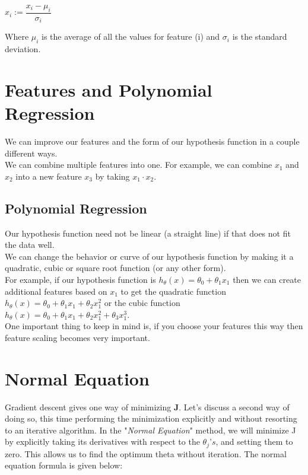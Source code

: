 \begin{center}
$x_i := \dfrac{x_i - \mu_i}{\sigma_i}$ 
\end{center}

Where $ \mu_i $ is the average of all the values for feature (i) and $ \sigma_i $ is the standard deviation.

\section{Features and Polynomial Regression}

We can improve our features and the form of our hypothesis function in a couple different ways.\\

We can combine multiple features into one. For example, we can combine $ x_1 $ and $ x_2  $ into a new feature $ x_3 $ by taking $ x_1 \cdot  x_2 $.\\

\subsection{Polynomial Regression}

Our hypothesis function need not be linear (a straight line) if that does not fit the data well.\\

We can change the behavior or curve of our hypothesis function by making it a quadratic, cubic or square root function (or any other form).\\

For example, if our hypothesis function is $ h_\theta(x) = \theta_0 + \theta_1 x_1 $ then we can create additional features based on $ x_1 $ to get the quadratic function $ h_\theta(x) = \theta_0 + \theta_1 x_1 + \theta_2 x_1^2 $ or the cubic function $ h_\theta(x) = \theta_0 + \theta_1 x_1 + \theta_2 x_1^2 + \theta_3 x_1^3 $.\\

One important thing to keep in mind is, if you choose your features this way then feature scaling becomes very important.

\section{Normal Equation}

Gradient descent gives one way of minimizing \textbf{J}. Let’s discuss a second way of doing so, this time performing the minimization explicitly and without resorting to an iterative algorithm. In the "\textit{Normal Equation}" method, we will minimize J by explicitly taking its derivatives with respect to the $ \theta_j ’s $, and setting them to zero. This allows us to find the optimum theta without iteration. The normal equation formula is given below:

